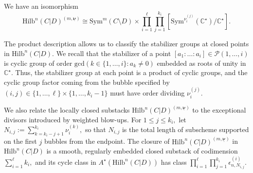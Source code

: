 \documentclass[10.5pt]{amsart}
\theoremstyle{definition}
\theoremstyle{definition}
\theoremstyle{definition}
\theoremstyle{definition}
\newtheorem{definition}[theorem]{Definition}
\newcommand{\Hilb}{\mathrm{Hilb}}
\newcommand{\Sym}{\mathrm{Sym}}
\newcommand{\bi}{\boldsymbol{i}}
\newcommand{\terry}[1]{{\color{pink} \sf  Terry: [#1]}}
\begin{document}



We have an isomorphism \[\Hilb^{n}(C|D)^{(m,\underline{\boldsymbol{\nu}})}\cong \Sym^{m}(C\setminus D)\times \prod_{i=1}^{\ell}\prod_{j = 1}^{k_i}[\mathrm{Sym}^{\nu_i^{(j)}}(\mathbb{C}^\star)/\mathbb{C}^\star].\]

The product description allows us to classify the stabilizer groups at closed points in $\Hilb^{n}(C|D).$ We recall that the stabilizer of a point $[a_1:\dots:a_i]\in \mathcal{P}(1,\dots, i)$ is cyclic group of order $\mathrm{gcd}(k\in \{1,\dots, i\}: a_k\neq 0)$ embedded as roots of unity in $\mathbb{C}^\star$. Thus, the stabilizer group at each point is a product of cyclic groups, and the cyclic group factor coming from the bubble specified by $(i,j)\in \{1,\dots, \ell\}\times \{1,\dots, k_i-1\}$ must have order dividing $\nu_{i}^{(j)}.$

We also relate the locally closed substacks $\Hilb^{n}(C|D)^{(m,\underline{\boldsymbol{\nu}})}$ to the exceptional divisors introduced by weighted blow-ups. For $1\leq j\leq k_i,$ let $N_{i,j}:=\sum_{k=k_i-j+1}^{k_i}\nu_{i}^{(k)},$ so that $N_{i,j}$ is the total length of subscheme supported on the first $j$ bubbles from the endpoint. The closure of $\Hilb^{n}(C|D)^{(m,\underline{\boldsymbol{\nu}})}$ in $\Hilb^n(C|D)$ is a smooth, regularly embedded closed substack of codimension $\sum_{i=1}^\ell k_i,$ and its cycle class in $A^{\star}(\Hilb^n(C|D))$ has class $\prod_{i=1}^{\ell}\prod_{j=1}^{k_i}\epsilon^{(i)}_{n, N_{i,j}}.$





    
\end{document}
